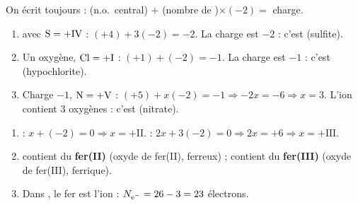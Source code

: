 \documentclass[11pt,a4paper]{article}
\begin{document}
\begin{corrige}
On écrit toujours : (n.o.\ central) $+$ (nombre de )$\times(-2) = $ charge.
\begin{enumerate}[label=\alph*)]
  \item {} avec $\ce{S}=+\mathrm{IV}$ : $(+4)+3(-2)=-2$. La charge est $-2$ : c'est  (sulfite).
  \item Un oxygène, $\ce{Cl}=+\mathrm{I}$ : $(+1)+(-2)=-1$. La charge est $-1$ : c'est  (hypochlorite).
  \item Charge $-1$, $\ce{N}=+\mathrm{V}$ : $(+5)+x(-2)=-1 \Rightarrow -2x=-6 \Rightarrow x=3$.
        L'ion contient $3$ oxygènes : c'est  (nitrate).
\end{enumerate}
\end{corrige}

\begin{corrige}
\begin{enumerate}[label=\alph*)]
  \item {} : $x+(-2)=0 \Rightarrow x=+\mathrm{II}$. \quad {} : $2x+3(-2)=0 \Rightarrow 2x=+6 \Rightarrow x=+\mathrm{III}$.
  \item {} contient du \textbf{fer(II)} (oxyde de fer(II), ferreux) ;  contient du
        \textbf{fer(III)} (oxyde de fer(III), ferrique).
  \item Dans , le fer est l'ion  : $N_{\ce{e-}}=26-3=23$ électrons.
\end{enumerate}
\end{corrige}
\end{document}

